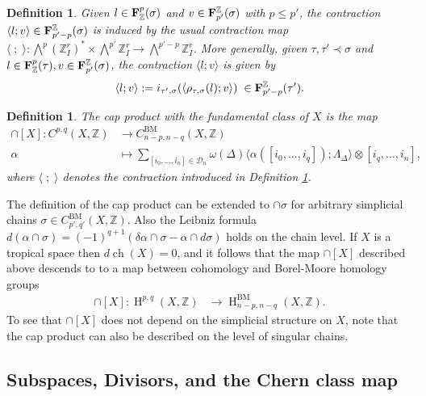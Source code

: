 \documentclass[11pt]{article}
\numberwithin{equation}{numsection}
\newcommand{\ZZ}{{\mathbb Z}}
\newcommand{\Z}{{\mathbb Z}}
\newcommand{\DD}{\mathcal{D}}
\newcommand{\rmap}{\rho_{\tau,\sigma}}
\DeclareMathOperator{\ch}{ch}
\DeclareMathOperator{\BM}{BM}
\DeclareMathOperator{\HH}{H}
\newtheorem{defn}[thm]{Definition}
\begin{document}
\begin{defn}\label{def:contract}
Given $l \in {\bf F}_\Z^p(\sigma)$ and $v \in {\bf F}^\Z_{p'}(\sigma)$ with $p \leq p'$, 
the \emph{contraction} $\langle l; v \rangle \in {\bf F}^\Z_{p'-p}(\sigma)$
is induced by the usual contraction map 
$\langle \; ; \; \rangle \colon \bigwedge^p (\Z^r_I)^* \times \bigwedge^{p'} \Z^r_I \to \bigwedge^{p'-p} \Z^r_I$.
More generally, given $\tau, \tau' \prec \sigma$ and $l \in {\bf F}_\Z^p(\tau), v \in {\bf F}^\Z_{p'}(\sigma)$, the \emph{contraction} 
$\langle l; v \rangle$ is given by 
\begin{align*}
\langle l; v \rangle := i_{\tau',\sigma}(\langle \rmap(l); v \rangle) \; \in {\bf F}^\Z_{p'-p}(\tau').
\end{align*}
\end{defn}

\begin{defn}\label{def:capwithfun}
The  \emph{cap product with the fundamental class of $X$} is the map
\begin{align*}
\cap [X] \colon C^{p,q}(X, \Z)  &\to C_{n-p,n-q}^{\BM}(X, \Z) \\
\alpha & \mapsto \sum_{[i_0, \dots, i_n] \in \DD_n} \omega(\Delta) \langle \alpha([i_0, \dots, i_q]); \Lambda_\Delta \rangle \otimes [i_q, \dots, i_n], 
\end{align*}
where $\langle \; ; \; \rangle$ denotes the contraction introduced in Definition \ref{def:contract}.\end{defn}

The definition of the cap product can be extended to $\cap \sigma$ for arbitrary simplicial chains $\sigma \in C^{\BM}_{p',q'}(X, \ZZ)$.
Also the Leibniz formula $d(\alpha \cap \sigma) = (-1)^{q+1} (\delta \alpha \cap \sigma - \alpha \cap d\sigma)$ holds 
on the chain level. 
If $X$ is a tropical space then $d\ch(X) = 0$, and it follows that the map $\cap [X]$ described above descends to 
to a map between cohomology and Borel-Moore  homology groups 
\begin{align*}
\cap [X] \colon \HH^{p,q}(X, \Z)  &\to \HH_{n-p,n-q}^{\BM}(X, \Z). 
\end{align*}
To see that $\cap [X]$ does not depend on the simplicial structure on $X$, 
note that the cap product can also be described on the level of singular chains. 


\subsection{Subspaces, Divisors, and the Chern class map}
\end{document}
